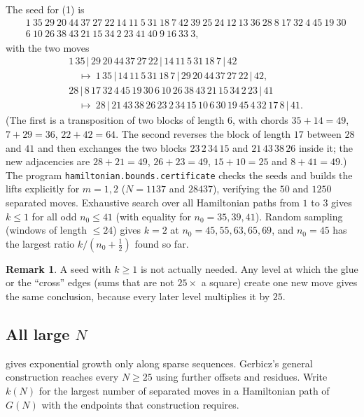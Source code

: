 \documentclass[11pt]{amsart}
\theoremstyle{definition}
\newtheorem{remark}[theorem]{Remark}
\begin{document}
The seed for (1) is
\[
\begin{aligned}
&1\ 35\ 29\ 20\ 44\ 37\ 27\ 22\ 14\ 11\ 5\ 31\ 18\ 7\ 42\ 39\ 25\ 24\ 12\ 13\ 36\ 28\ 8\ 17\ 32\ 4\ 45\ 19\ 30\\
&6\ 10\ 26\ 38\ 43\ 21\ 15\ 34\ 2\ 23\ 41\ 40\ 9\ 16\ 33\ 3,
\end{aligned}
\]
with the two moves
\[
\begin{aligned}
&1\,35\,|\,29\,20\,44\,37\,27\,22\,|\,14\,11\,5\,31\,18\,7\,|\,42\\
&\quad\longmapsto\ 1\,35\,|\,14\,11\,5\,31\,18\,7\,|\,29\,20\,44\,37\,27\,22\,|\,42,\\[2pt]
&28\,|\,8\,17\,32\,4\,45\,19\,30\,6\,10\,26\,38\,43\,21\,15\,34\,2\,23\,|\,41\\
&\quad\longmapsto\ 28\,|\,21\,43\,38\,26\,23\,2\,34\,15\,10\,6\,30\,19\,45\,4\,32\,17\,8\,|\,41 .
\end{aligned}
\]
(The first is a transposition of two blocks of length $6$, with chords
$35+14=49$, $7+29=36$, $22+42=64$. The second reverses the block of length $17$ between $28$ and $41$ and then
exchanges the two blocks $23\,2\,34\,15$ and $21\,43\,38\,26$ inside it; the new
adjacencies are $28+21=49$, $26+23=49$, $15+10=25$ and $8+41=49$.) The program
\texttt{hamiltonian.bounds.certificate} checks the seeds and builds the lifts
explicitly for $m=1,2$ ($N=1137$ and $28437$), verifying the $50$ and $1250$
separated moves. Exhaustive search over all Hamiltonian paths from $1$ to $3$ gives
$k\le1$ for all odd $n_0\le 41$ (with equality for $n_0=35,39,41$). Random sampling
(windows of length $\le24$) gives $k=2$ at $n_0=45,55,63,65,69$, and $n_0=45$ has the largest ratio
$k/(n_0+\frac12)$ found so far.

\begin{remark}
A seed with $k\ge1$ is not actually needed. Any level at which the glue or the
``cross'' edges (sums that are not $25\times$ a square) create one new move
gives the same conclusion, because every later level multiplies it by $25$.
\end{remark}

\subsection{All large $N$}
 gives exponential growth only along sparse sequences. Gerbicz's
general construction \cite{Gerbicz} reaches every $N\ge25$ using further offsets and
residues. Write $k(N)$ for the largest number of separated moves in a Hamiltonian path of
$G(N)$ with the endpoints that construction requires.
\end{document}

